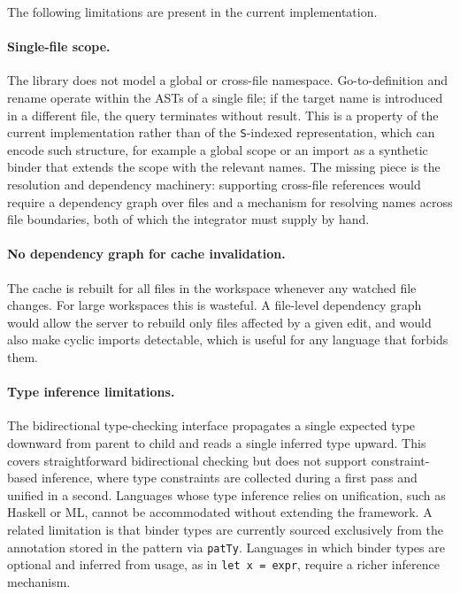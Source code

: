 The following limitations are present in the current implementation.

\paragraph{Single-file scope.}
The library does not model a global or cross-file namespace.
Go-to-definition and rename operate within the ASTs of a single file; if the target name is introduced in a different file, the query terminates without result.
This is a property of the current implementation rather than of the \texttt{S}-indexed representation, which can encode such structure, for example a global scope or an import as a synthetic binder that extends the scope with the relevant names.
The missing piece is the resolution and dependency machinery: supporting cross-file references would require a dependency graph over files and a mechanism for resolving names across file boundaries, both of which the integrator must supply by hand.

\paragraph{No dependency graph for cache invalidation.}
The cache is rebuilt for all files in the workspace whenever any watched file changes.
For large workspaces this is wasteful.
A file-level dependency graph would allow the server to rebuild only files affected by a given edit, and would also make cyclic imports detectable, which is useful for any language that forbids them.

\paragraph{Type inference limitations.}
The bidirectional type-checking interface propagates a single expected type downward from parent to child and reads a single inferred type upward.
This covers straightforward bidirectional checking but does not support constraint-based inference, where type constraints are collected during a first pass and unified in a second.
Languages whose type inference relies on unification, such as Haskell or ML, cannot be accommodated without extending the framework.
A related limitation is that binder types are currently sourced exclusively from the annotation stored in the pattern via \texttt{patTy}.
Languages in which binder types are optional and inferred from usage, as in \texttt{let x = expr}, require a richer inference mechanism.

